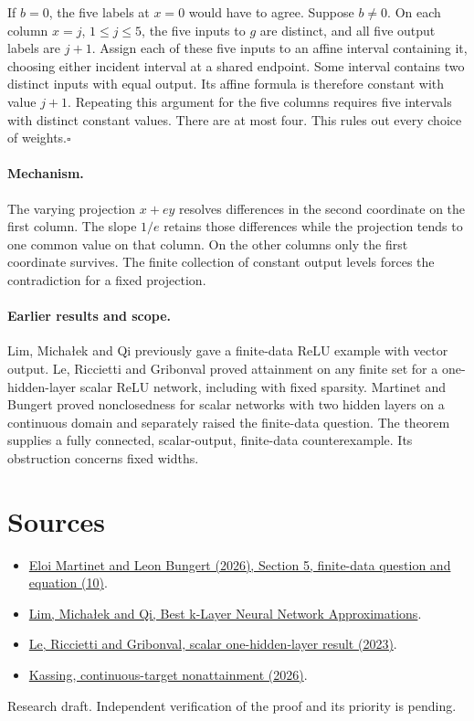 \documentclass[11pt]{article}
\begin{document}
If $b=0$, the five labels at $x=0$ would have to agree. Suppose $b\ne0$. On each column $x=j$, $1\leq j\leq5$, the five inputs to $g$ are distinct, and all five output labels are $j+1$. Assign each of these five inputs to an affine interval containing it, choosing either incident interval at a shared endpoint. Some interval contains two distinct inputs with equal output. Its affine formula is therefore constant with value $j+1$. Repeating this argument for the five columns requires five intervals with distinct constant values. There are at most four. This rules out every choice of weights.\hfill$\square$

\paragraph{Mechanism.} The varying projection $x+ey$ resolves differences in the second coordinate on the first column. The slope $1/e$ retains those differences while the projection tends to one common value on that column. On the other columns only the first coordinate survives. The finite collection of constant output levels forces the contradiction for a fixed projection.

\paragraph{Earlier results and scope.} Lim, Micha\l ek and Qi previously gave a finite-data ReLU example with vector output. Le, Riccietti and Gribonval proved attainment on any finite set for a one-hidden-layer scalar ReLU network, including with fixed sparsity. Martinet and Bungert proved nonclosedness for scalar networks with two hidden layers on a continuous domain and separately raised the finite-data question. The theorem supplies a fully connected, scalar-output, finite-data counterexample. Its obstruction concerns fixed widths.

\section*{Sources}
\begin{itemize}
\item \href{https://arxiv.org/abs/2611.09887}{Eloi Martinet and Leon Bungert (2026), Section 5, finite-data question and equation (10)}.
\item \href{https://doi.org/10.1007/s00365-021-09545-2}{Lim, Micha\l{}ek and Qi, Best k-Layer Neural Network Approximations}.
\item \href{https://arxiv.org/abs/2306.02666}{Le, Riccietti and Gribonval, scalar one-hidden-layer result (2023)}.
\item \href{https://arxiv.org/abs/2610.31264}{Kassing, continuous-target nonattainment (2026)}.
\end{itemize}
{\small Research draft. Independent verification of the proof and its priority is pending.}
\end{document}
